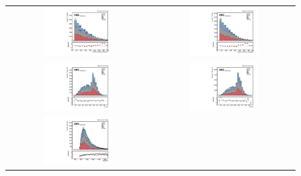 \begin{figure}[t]
  \centering
  \begin{tabular}{cc}
    \includegraphics[width=0.5\textwidth]{Figures/dataMC_trig_antiTau21/puppiSDMassThea_j0.pdf} &
    \includegraphics[width=0.5\textwidth]{Figures/dataMC_trig_antiTau21/puppiSDMassThea_j1.pdf} \\
     \includegraphics[width=0.5\textwidth]{Figures/dataMC_trig_antiTau21/puppiTau21_j0.pdf} &
    \includegraphics[width=0.5\textwidth]{Figures/dataMC_trig_antiTau21/puppiTau21_j1.pdf} \\
     \includegraphics[width=0.5\textwidth]{Figures/dataMC_trig_antiTau21/totalMassRed.pdf} &

\end{tabular}
\end{figure}
